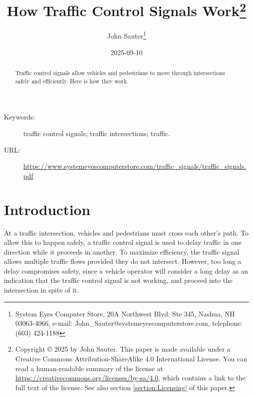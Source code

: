 \documentclass[letterpaper,twoside]{article}
\begin{document}
\title{How Traffic Control Signals Work\footnote{Copyright
    {\copyright} 2025 by John Sauter.
    This paper is made available under a
    Creative Commons Attribution-ShareAlike 4.0 International License.
    You can read a human-readable summary of the license at
    \href{https://creativecommons.org/licenses/by-sa/4.0}{https://creativecommons.org/licenses/by-sa/4.0},
    which contains a link to the full text of the license.
    See also section \ref{section:Licensing} of this paper.}
}
\author{John Sauter\footnote{
    System Eyes Computer Store,
    20A Northwest Blvd.  Ste 345,
    Nashua, NH  03063-4066,
    e-mail: John\_Sauter@systemeyescomputerstore.com,
    telephone: (603) 424-1188}}

\date{2025-09-10}
\maketitle
\begin{abstract}
  Traffic control signals allow vehicles and pedestrians to move through
  intersections safely and efficiently.  Here is how they work.
\end{abstract}
\begin{description}
\item[Keywords:]traffic control signals; traffic intersections; traffic.
\item[URL:]\href{https://www.systemeyescomputerstore.com/traffic\_signals/traffic\_signalst.pdf}{https://www.systemeyescomputerstore.com/traffic\_signals/traffic\_signals.pdf}
\end{description}
\newpage

\section{Introduction}
At a traffic intersection, vehicles and pedestrians must cross each other's
path.  To allow this to happen safely, a traffic control signal is used to
delay traffic in one direction while it proceeds in another.  To maximize
efficiency, the traffic signal allows multiple traffic flows provided they
do not intersect.  However, too long a delay compromises safety, since a
vehicle operator will consider a long delay as an indication that the
traffic control signal is not working, and proceed into the intersection
in spite of it.
\end{document}
